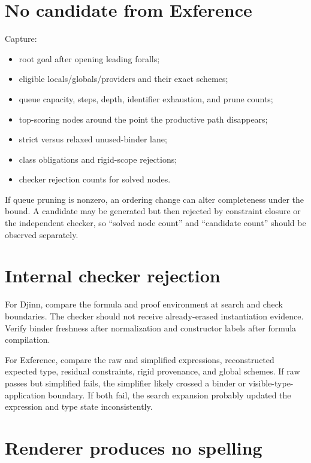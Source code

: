 \documentclass[10pt,letterpaper,oneside]{report}
\begin{document}
\section{No candidate from Exference}

Capture:

\begin{itemize}
  \item root goal after opening leading foralls;
  \item eligible locals/globals/providers and their exact schemes;
  \item queue capacity, steps, depth, identifier exhaustion, and prune counts;
  \item top-scoring nodes around the point the productive path disappears;
  \item strict versus relaxed unused-binder lane;
  \item class obligations and rigid-scope rejections;
  \item checker rejection counts for solved nodes.
\end{itemize}

If queue pruning is nonzero, an ordering change can alter completeness under the bound. A candidate may be generated but then rejected by constraint closure or the independent checker, so ``solved node count'' and ``candidate count'' should be observed separately.

\section{Internal checker rejection}

For Djinn, compare the formula and proof environment at search and check boundaries. The checker should not receive already-erased instantiation evidence. Verify binder freshness after normalization and constructor labels after formula compilation.

For Exference, compare the raw and simplified expressions, reconstructed expected type, residual constraints, rigid provenance, and global schemes. If raw passes but simplified fails, the simplifier likely crossed a binder or visible-type-application boundary. If both fail, the search expansion probably updated the expression and type state inconsistently.

\section{Renderer produces no spelling}
\end{document}
